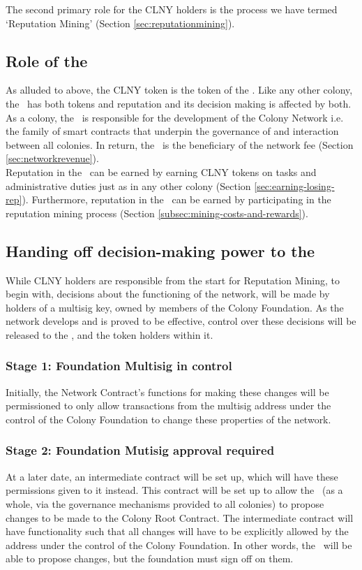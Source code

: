 The second primary role for the CLNY holders is the process we have termed `Reputation Mining' (Section \ref{sec:reputationmining}).

\subsection{Role of the \rc}
As alluded to above, the CLNY token is the token of the \rc. Like any other colony, the \rc\ has both tokens and reputation and its decision making is affected by both.\\
As a colony, the \rc\ is responsible for the development of the Colony Network i.e. the family of smart contracts that underpin the governance of and interaction between all colonies. In return, the \rc\ is the beneficiary of the network fee (Section \ref{sec:networkrevenue}).\\
Reputation in the \rc\ can be earned by earning CLNY tokens on tasks and administrative duties just as in any other colony (Section \ref{sec:earning-losing-rep}). Furthermore, reputation in the \rc\ can be earned by participating in the reputation mining process (Section \ref{subsec:mining-costs-and-rewards}).

\subsection{Handing off decision-making power to the \rc}\label{subsec:ceding-control-to-rc}
While CLNY holders are responsible from the start for Reputation Mining, to begin with, decisions about the functioning of the network, will be made by holders of a multisig key, owned by members of the Colony Foundation. As the network develops and is proved to be effective, control over these decisions will be released to the \rc, and the token holders within it.

\subsubsection*{Stage 1: Foundation Multisig in control}
Initially, the Network Contract's functions for making these changes will be permissioned to only allow transactions from the multisig address under the control of the Colony Foundation to change these properties of the network. 

\subsubsection*{Stage 2: Foundation Mutisig approval required}
At a later date, an intermediate contract will be set up, which will have these permissions given to it instead. This contract will be set up to allow the \rc\ (as a whole, via the governance mechanisms provided to all colonies) to propose changes to be made to the Colony Root Contract. The intermediate contract will have functionality such that all changes will have to be explicitly allowed by the address under the control of the Colony Foundation. In other words, the \rc\ will be able to propose changes, but the foundation must sign off on them.

